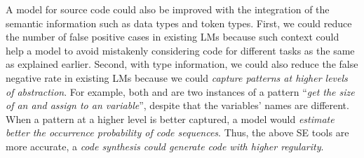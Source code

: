 {%


\vspace{0.03in}
 A model for source code could also be
improved with the integration of the semantic information such as data
types and token types.
First, we could reduce the number of false positive cases in
existing LMs because such context could help a model to avoid
mistakenly considering code for different tasks as the same as explained earlier.
%
Second, with type information, we could also reduce the false negative
rate in existing LMs because we could {\em capture patterns at higher
  levels of abstraction}.
%
For example, both  and  are two instances of a pattern ``{\em get the size
  of an  and assign to an  variable}'',
despite that the variables' names are different.
%
%
When a pattern at a higher level is better captured, a model would
{\em estimate better the occurrence probability of code
  sequences}. Thus, the above SE tools are
more accurate, \eg a {\em code synthesis could generate code with
  higher regularity}.

%


}
